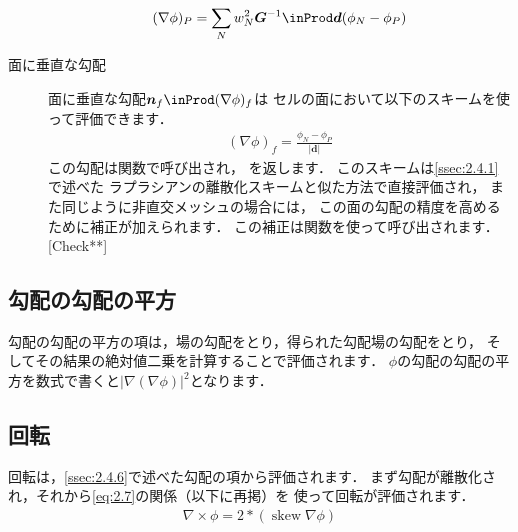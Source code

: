 \begin{description}
\begin{align}
             \label{eq:2.27}
             (\nabla\phi)_{P}
             = \sum_{N}w_{N}^{2}\bm{G}^{-1} \inProd \bm{d}(\phi_{N} - \phi_{P})
            \end{align}
 \item[面に垂直な勾配] 面に垂直な勾配$\bm{n}_{f} \inProd (\nabla\phi)_{f}$は
%  
            セルの面において以下のスキームを使って評価できます．
            \begin{align}
             \label{eq:2.28}
             (\nabla\phi)_{f} = \frac{\phi_{N} - \phi_{P}}{|\bm{d}|}
            \end{align}
            この勾配は関数で呼び出され，
            を返します．
            このスキームは\autoref{ssec:2.4.1}で述べた
            ラプラシアンの離散化スキームと似た方法で直接評価され，
            また同じように非直交メッシュの場合には，
            この面の勾配の精度を高めるために補正が加えられます．
            この補正は関数を使って呼び出されます．
            [Check**]
\end{description}


\subsection{勾配の勾配の平方}
\label{ssec:2.4.7}
勾配の勾配の平方の項は，場の勾配をとり，得られた勾配場の勾配をとり，
そしてその結果の絶対値二乗を計算することで評価されます．
$\phi$の勾配の勾配の平方を数式で書くと$|\nabla (\nabla\phi)|^{2}$となります．


\subsection{回転}
\label{ssec:2.4.8}
回転は，\autoref{ssec:2.4.6}で述べた勾配の項から評価されます．
まず勾配が離散化され，それから\autoref{eq:2.7}の関係（以下に再掲）を
使って回転が評価されます．
\begin{align*}
 \nabla \times \phi = 2 \mathop{*} (\mathop{\mathrm{skew}}\nabla\phi)
\end{align*}


